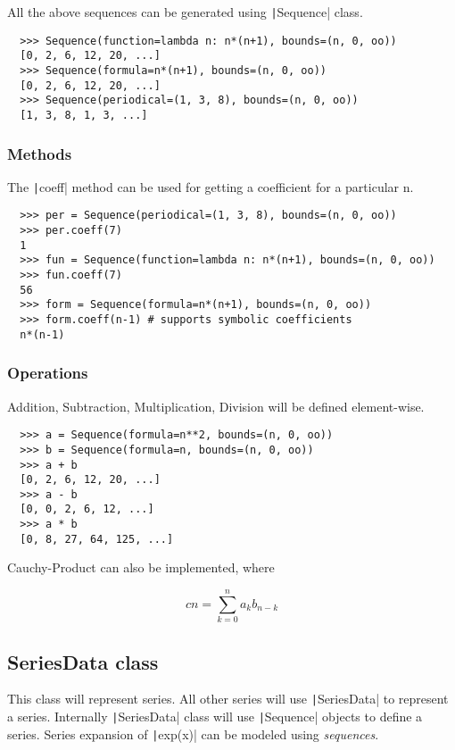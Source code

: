 \documentclass[a4paper,12pt]{article}
\newcommand{\pyline}[1]{\texttt|#1|}
\begin{document}
All the above sequences can be generated using \pyline{Sequence} class.

\begin{verbatim}
  >>> Sequence(function=lambda n: n*(n+1), bounds=(n, 0, oo))
  [0, 2, 6, 12, 20, ...]
  >>> Sequence(formula=n*(n+1), bounds=(n, 0, oo))
  [0, 2, 6, 12, 20, ...]
  >>> Sequence(periodical=(1, 3, 8), bounds=(n, 0, oo))
  [1, 3, 8, 1, 3, ...]
\end{verbatim}

\subsubsection{Methods}

The \pyline{coeff} method can be used for getting a coefficient for a particular n.

\begin{verbatim}
  >>> per = Sequence(periodical=(1, 3, 8), bounds=(n, 0, oo))
  >>> per.coeff(7)
  1
  >>> fun = Sequence(function=lambda n: n*(n+1), bounds=(n, 0, oo))
  >>> fun.coeff(7)
  56
  >>> form = Sequence(formula=n*(n+1), bounds=(n, 0, oo))
  >>> form.coeff(n-1) # supports symbolic coefficients
  n*(n-1)
\end{verbatim}

\subsubsection{Operations}

Addition, Subtraction, Multiplication, Division will be defined element-wise.

\begin{verbatim}
  >>> a = Sequence(formula=n**2, bounds=(n, 0, oo))
  >>> b = Sequence(formula=n, bounds=(n, 0, oo))
  >>> a + b
  [0, 2, 6, 12, 20, ...]
  >>> a - b
  [0, 0, 2, 6, 12, ...]
  >>> a * b
  [0, 8, 27, 64, 125, ...]
\end{verbatim}

Cauchy-Product \cite{convolution} can also be implemented, where

$$cn =\sum\limits_{k=0}^n a_k b_{n-k}$$

\subsection{SeriesData class}

This class will represent series. All other series will use
\pyline{SeriesData} to represent a series. Internally
\pyline{SeriesData} class will use \pyline{Sequence} objects to define
a series. Series expansion of \pyline{exp(x)} can be modeled using
\textit{sequences}.
\end{document}
